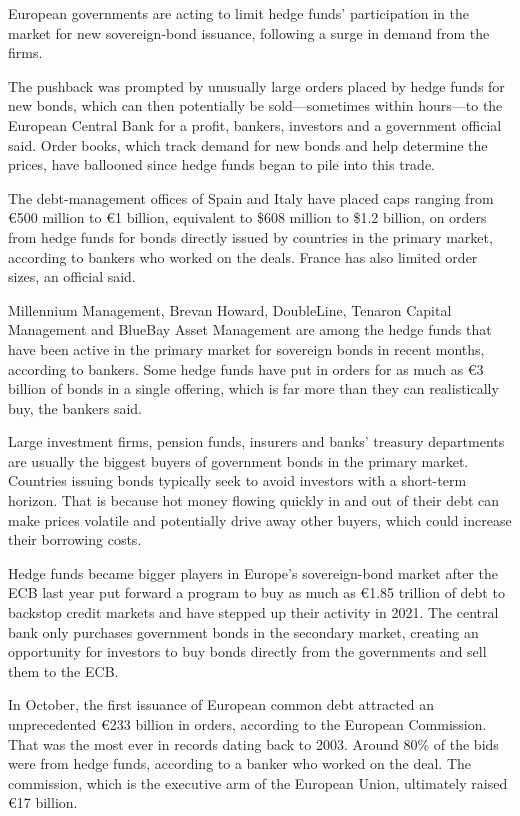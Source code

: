 \documentclass[
]{book}
\begin{document}
European governments are acting to limit hedge funds' participation in the market for new sovereign-bond issuance, following a surge in demand from the firms.

The pushback was prompted by unusually large orders placed by hedge funds for new bonds, which can then potentially be sold---sometimes within hours---to the European Central Bank for a profit, bankers, investors and a government official said. Order books, which track demand for new bonds and help determine the prices, have ballooned since hedge funds began to pile into this trade.

The debt-management offices of Spain and Italy have placed caps ranging from €500 million to €1 billion, equivalent to \$608 million to \$1.2 billion, on orders from hedge funds for bonds directly issued by countries in the primary market, according to bankers who worked on the deals. France has also limited order sizes, an official said.

Millennium Management, Brevan Howard, DoubleLine, Tenaron Capital Management and BlueBay Asset Management are among the hedge funds that have been active in the primary market for sovereign bonds in recent months, according to bankers. Some hedge funds have put in orders for as much as €3 billion of bonds in a single offering, which is far more than they can realistically buy, the bankers said.

Large investment firms, pension funds, insurers and banks' treasury departments are usually the biggest buyers of government bonds in the primary market. Countries issuing bonds typically seek to avoid investors with a short-term horizon. That is because hot money flowing quickly in and out of their debt can make prices volatile and potentially drive away other buyers, which could increase their borrowing costs.

Hedge funds became bigger players in Europe's sovereign-bond market after the ECB last year put forward a program to buy as much as €1.85 trillion of debt to backstop credit markets and have stepped up their activity in 2021. The central bank only purchases government bonds in the secondary market, creating an opportunity for investors to buy bonds directly from the governments and sell them to the ECB.

In October, the first issuance of European common debt attracted an unprecedented €233 billion in orders, according to the European Commission. That was the most ever in records dating back to 2003. Around 80\% of the bids were from hedge funds, according to a banker who worked on the deal. The commission, which is the executive arm of the European Union, ultimately raised €17 billion.
\end{document}

